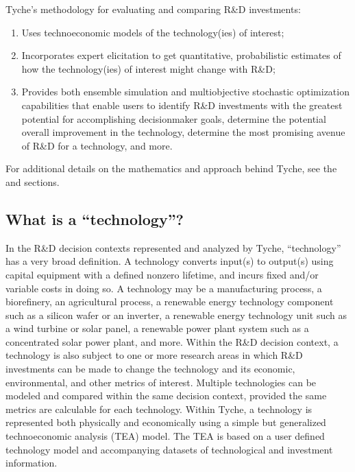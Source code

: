 \documentclass[letterpaper,10pt,english]{sphinxmanual}
\begin{document}
\sphinxAtStartPar
Tyche’s methodology for evaluating and comparing R\&D investments:
\begin{enumerate}
%
\item {} 
\sphinxAtStartPar
Uses techno\sphinxhyphen{}economic models of the technology(ies) of interest;

\item {} 
\sphinxAtStartPar
Incorporates expert elicitation to get quantitative, probabilistic estimates of how the technology(ies) of interest might change with R\&D;

\item {} 
\sphinxAtStartPar
Provides both ensemble simulation and multi\sphinxhyphen{}objective stochastic optimization capabilities that enable users to identify R\&D investments with the greatest potential for accomplishing decision\sphinxhyphen{}maker goals, determine the potential overall improvement in the technology, determine the most promising avenue of R\&D for a technology, and more.

\end{enumerate}

\sphinxAtStartPar
For additional details on the mathematics and approach behind Tyche, see the {\hyperref[\detokenize{formulation:sec-formulation}]{}} and {\hyperref[\detokenize{approach:sec-approach}]{}} sections.


\subsection{What is a “technology”?}
\label{\detokenize{cheat-sheet:what-is-a-technology}}
\sphinxAtStartPar
In the R\&D decision contexts represented and analyzed by Tyche, “technology” has a very broad definition. A technology converts input(s) to output(s) using capital equipment with a defined non\sphinxhyphen{}zero lifetime, and incurs fixed and/or variable costs in doing so. A technology may be a manufacturing process, a biorefinery, an agricultural process, a renewable energy technology component such as a silicon wafer or an inverter, a renewable energy technology unit such as a wind turbine or solar panel, a renewable power plant system such as a concentrated solar power plant, and more. Within the R\&D decision context, a technology is also subject to one or more research areas in which R\&D investments can be made to change the technology and its economic, environmental, and other metrics of interest. Multiple technologies can be modeled and compared within the same decision context, provided the same metrics are calculable for each technology. Within Tyche, a technology is represented both physically and economically using a simple but generalized techno\sphinxhyphen{}economic analysis (TEA) model. The TEA is based on a user defined technology model and accompanying datasets of technological and investment information.
\end{document}
